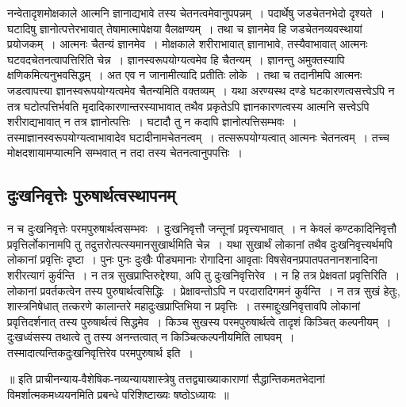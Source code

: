 		नन्वेतादृशमोक्षकाले आत्मनि ज्ञानाद्यभावे तस्य चेतनत्वमेवानुपपन्नम्~। पदार्थेषु जडचेतनभेदो दृश्यते~। घटादिषु ज्ञानोत्पत्तेरभावात् तेषामात्मापेक्षया वैलक्षण्यम्~। तथा च ज्ञानमेव हि जडचेतनव्यवस्थायां‌ प्रयोजकम्~। आत्मनः चैतन्यं ज्ञानमेव~। मोक्षकाले शरीराभावात् ज्ञानाभावे, तस्यैवाभावात् आत्मनः घटवदचेतनत्वापत्तिरिति चेन्न~। ज्ञानस्वरूपयोग्यत्वमेव हि चैतन्यम्~। ज्ञानन्तु अमुक्तस्यापि क्षणिकमित्यनुभवसिद्धम्~। अत एव न जानामीत्यादि प्रतीतिः लोके~। तथा च तदानीमपि आत्मनः जडत्वापत्त्या ज्ञानस्वरूपयोग्यत्वमेव चैतन्यमिति वक्तव्यम्~। यथा अरण्यस्थ दण्डे घटकारणत्वसत्त्वेऽपि न तत्र घटोत्पत्तिर्भवति मृदादिकारणान्तरस्याभावात् तथैव प्रकृतेऽपि ज्ञानकारणत्वस्य आत्मनि सत्त्वेऽपि शरीराद्यभावात् न तत्र ज्ञानोत्पत्तिः~। घटादौ तु न कदापि ज्ञानोत्पत्तिसम्भवः~। तस्माज्ञानस्वरूपयोग्यत्वाभावादेव घटादीनामचेतनत्वम्~। तत्सरूपयोग्यत्वात् आत्मनः चेतनत्वम्~। तच्च मोक्षदशायामप्यात्मनि सम्भवात् न तदा तस्य चेतनत्वानुपपत्तिः~।

		\subsection{दुःखनिवृत्तेः पुरुषार्थत्वस्थापनम्}

		न च दुःखनिवृत्तेः परमपुरुषार्थत्वसम्भवः~। दुःखनिवृत्तौ  जन्तूनां प्रवृत्त्यभावात्~। न केवलं कण्टकादिनिवृत्तौ प्रवृत्तिर्लोकानामपि तु तदुत्तरोत्पत्स्यमानसुखार्थमिति चेन्न~। यथा सुखार्थं लोकानां तथैव दुःखनिवृत्त्यर्थमपि लोकानां प्रवृत्तिः दृष्टा~। पुनः पुनः दुःखैः पीड्यमानाः रोगादिना आवृताः विषसेवनप्रपातपतनानशनादिना शरीरत्यागं कुर्वन्ति~। न तत्र सुखप्राप्तिरुद्देश्या, अपि तु दुःखनिवृत्तिरेव~। न हि तत्र प्रेक्षवतां प्रवृत्तिरिति~। लोकानां प्रवर्तकत्वेन तस्य पुरुषार्थत्वसिद्धिः~। प्रेक्षावन्तोऽपि न परदारादिगमनं कुर्वन्ति~। न तत्र सुखं हेतुः, शास्त्रनिषेधात् तत्करणे कालान्तरे महादुःखप्राप्तिभिया न प्रवृत्तिः~। तस्माद्दुःखनिवृत्तावपि लोकानां प्रवृत्तिदर्शनात् तस्य पुरुषार्थत्वं सिद्धमेव~। किञ्च सुखस्य परमपुरुषार्थत्वे तादृशं किञ्चित् कल्पनीयम्~। दुःखध्वंसस्य तथात्वे तु तस्य अनन्तत्वात् न किञ्चित्कल्पनीयमिति लाघवम्~। तस्मादात्यन्तिकदुःखनिवृत्तिरेव परमपुरुषार्थ इति~।

\begin{center}\begin{small}॥ इति प्राचीनन्याय-वैशेषिक-नव्यन्यायशास्त्रेषु तत्तद्व्याख्याकाराणां सैद्धान्तिकमतभेदानां विमर्शात्मकमध्ययनमिति प्रबन्धे  परिशिष्टाख्यः षष्ठोऽध्यायः~॥\end{small}\end{center}
